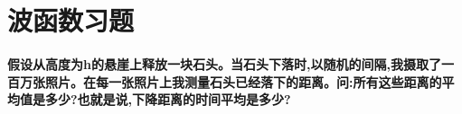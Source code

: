 \section{波函数习题}
	\paragraph*{\quad 假设从高度为h的悬崖上释放一块石头。当石头下落时,以随机的间隔,我摄取了一百万张照片。在每一张照片上我测量石头已经落下的距离。问:所有这些距离的平均值是多少?也就是说,下降距离的时间平均是多少?}